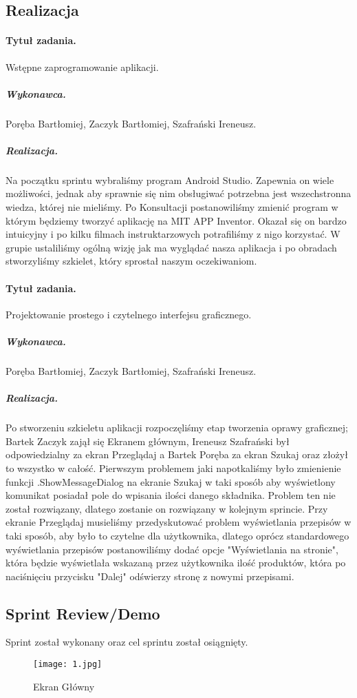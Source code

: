 \documentclass[a4paper]{article}
\begin{document}
	\subsection{Realizacja}
	
	\paragraph{Tytuł zadania.} Wstępne zaprogramowanie aplikacji.
	\subparagraph{Wykonawca.} Poręba Bartłomiej, Zaczyk Bartłomiej, Szafrański Ireneusz.
	\subparagraph{Realizacja.} Na początku sprintu wybraliśmy program Android Studio. Zapewnia on wiele możliwości, jednak aby sprawnie się nim obsługiwać potrzebna jest wszechstronna wiedza, której nie mieliśmy. Po Konsultacji postanowiliśmy zmienić program w którym będziemy tworzyć aplikację na MIT APP Inventor. Okazał się on bardzo intuicyjny i po kilku filmach instruktarzowych potrafiliśmy z nigo korzystać. W grupie ustaliliśmy ogólną wizję jak ma wyglądać nasza aplikacja i po obradach stworzyliśmy szkielet, który sprostał naszym oczekiwaniom.
	
	\paragraph{Tytuł zadania.} Projektowanie prostego i czytelnego interfejsu graficznego.
	\subparagraph{Wykonawca.} Poręba Bartłomiej, Zaczyk Bartłomiej, Szafrański Ireneusz.
	\subparagraph{Realizacja.}
	Po stworzeniu szkieletu aplikacji rozpoczęliśmy etap tworzenia oprawy graficznej; Bartek Zaczyk zajął się Ekranem głównym, Ireneusz Szafrański był odpowiedzialny za ekran Przeglądaj a Bartek Poręba za ekran Szukaj oraz złożył to wszystko w całość. Pierwszym problemem jaki napotkaliśmy było zmienienie funkcji .ShowMessageDialog na ekranie Szukaj w taki sposób aby wyświetlony komunikat posiadał pole do wpisania ilości danego składnika. Problem ten nie został rozwiązany, dlatego zostanie on rozwiązany w kolejnym sprincie. Przy ekranie Przeglądaj musieliśmy przedyskutować problem wyświetlania przepisów w taki sposób, aby było to czytelne dla użytkownika, dlatego oprócz standardowego wyświetlania przepisów postanowiliśmy dodać opcje "Wyświetlania na stronie", która będzie wyświetlała wskazaną przez użytkownika ilość produktów, która po naciśnięciu przycisku "Dalej" odświerzy stronę z nowymi przepisami.
	
	\subsection{Sprint Review/Demo}
	Sprint został wykonany oraz cel sprintu został osiągnięty.
	\begin{figure}
		\centering
		\texttt{[image: 1.jpg]}
		\caption{Ekran Główny}
		\label{glowny}
	\end{figure}
	
\end{document}
